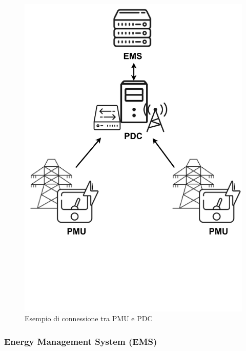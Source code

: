 \begin{figure}[h]
    \centering
    \includegraphics[trim= 0cm 20cm 0cm 0cm, clip, width=0.4\linewidth]{img/PMU-connection-v2.drawio.pdf}
    \caption{Esempio di connessione tra PMU e PDC \cite{PDC}}
    \label{comunicaizone-pdc}
\end{figure}


\newpage
\subsubsection{Energy Management System (EMS)}




    
    
